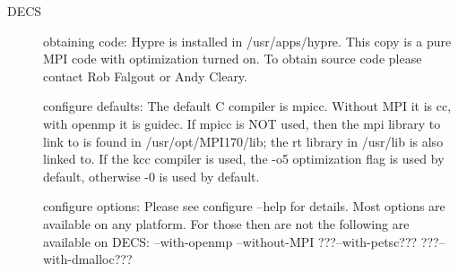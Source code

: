 \begin{description}
\item[DECS]
obtaining code:
\newline
Hypre is installed in /usr/apps/hypre.  This copy is a pure MPI code with optimization turned on. To obtain source code please contact Rob Falgout or Andy Cleary.
\newline

configure defaults:
\newline
The default C compiler is mpicc.  Without MPI it is cc, with openmp it is guidec.  If mpicc is NOT used, then the mpi library to link to is found in /usr/opt/MPI170/lib; the rt library in /usr/lib is also linked to.  If the kcc compiler is used, the -o5 optimization flag is used by default, otherwise -0 is used by default.   
\newline

configure options:
\newline
Please see configure --help for details.  Most options are available on any platform.  For those then are not the following are available on DECS:  --with-openmp --without-MPI ???--with-petsc???  ???--with-dmalloc??? 
\newline

\end{description}


